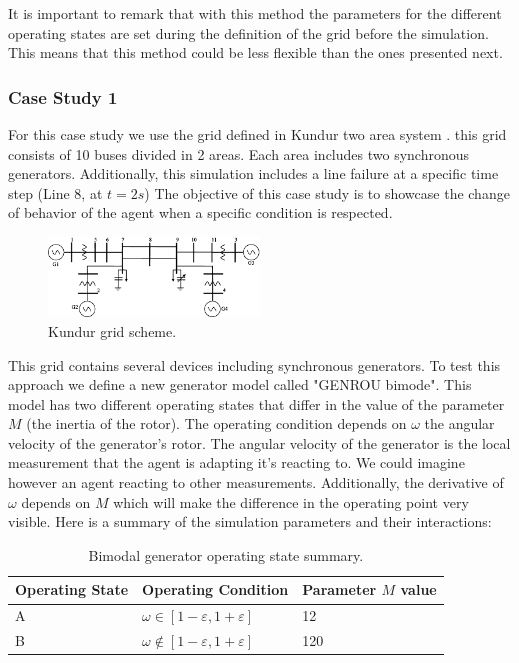\documentclass{report}
\begin{document}
It is important to remark that with this method the parameters for the different operating states are set during the definition of the grid before the simulation. This means that this method could be less flexible than the ones presented next. 

\subsubsection{Case Study 1}

For this case study we use the grid defined in Kundur two area system  \cite{grids:kundur}. this grid consists of 10 buses divided in 2 areas. Each area includes two synchronous generators. Additionally, this simulation includes a line failure at a specific time step (Line 8, at $t=2s$) The objective of this case study is to showcase the change of behavior of the agent when a specific condition is respected. 

\begin{figure}[!htb]
    \centering
    \includegraphics[width=0.5\textwidth]{pictures/kundurgrid.png}
    \caption{Kundur grid scheme. \cite{grids:kundur}}
    \label{fig:kundur2}
\end{figure}

This grid contains several devices including synchronous generators. To test this approach we define a new generator model called "GENROU bimode". This model has two different operating states that differ in the value of the parameter $M$ (the inertia of the rotor). The operating condition depends on $\omega$ the angular velocity of the generator's rotor. The angular velocity of the generator is the local measurement that the agent is adapting it's reacting to. We could imagine however an agent reacting to other measurements. Additionally, the derivative of $\omega$ depends on $M$ which will make the difference in the operating point very visible. Here is a summary of the simulation parameters and their interactions:\\

\begin{table}[H]
    \centering
    \begin{tabular}{|l|l|l|}
    \hline
    Operating State & Operating Condition                              & Parameter $M$ value \\ \hline
    A               & $\omega \in [1 - \varepsilon, 1 + \varepsilon]$ & 12  \\ \hline
    B               & $\omega \notin [1 - \varepsilon, 1 + \varepsilon]$ & 120               \\ \hline
    \end{tabular}
    \caption{Bimodal generator operating state summary.}
\end{table}
\end{document}

